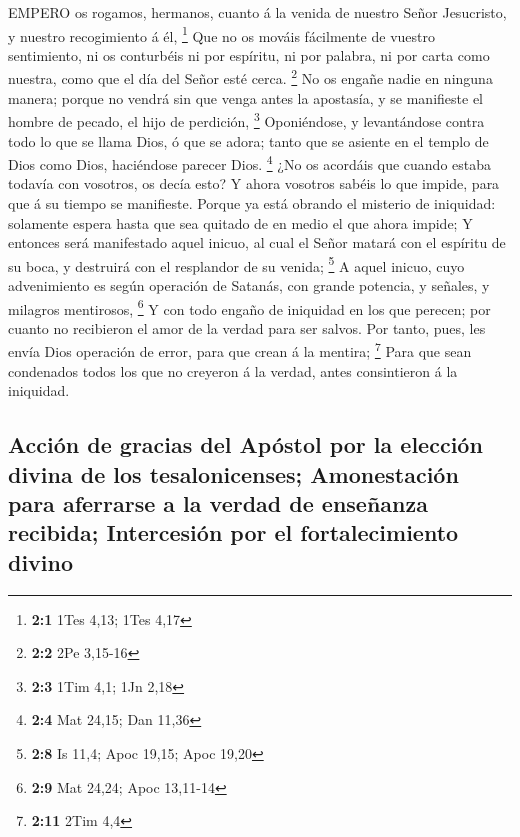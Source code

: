  EMPERO os rogamos, hermanos, cuanto á la venida de nuestro
Señor Jesucristo, y nuestro recogimiento á él, \footnote{\textbf{2:1}
  1Tes 4,13; 1Tes 4,17}  Que no os mováis fácilmente de
vuestro sentimiento, ni os conturbéis ni por espíritu, ni por palabra,
ni por carta como nuestra, como que el día del Señor esté cerca.
\footnote{\textbf{2:2} 2Pe 3,15-16}  No os engañe nadie en
ninguna manera; porque no vendrá sin que venga antes la apostasía, y se
manifieste el hombre de pecado, el hijo de perdición, \footnote{\textbf{2:3}
  1Tim 4,1; 1Jn 2,18}  Oponiéndose, y levantándose contra
todo lo que se llama Dios, ó que se adora; tanto que se asiente en el
templo de Dios como Dios, haciéndose parecer Dios. \footnote{\textbf{2:4}
  Mat 24,15; Dan 11,36}  ¿No os acordáis que cuando estaba
todavía con vosotros, os decía esto?  Y ahora vosotros
sabéis lo que impide, para que á su tiempo se manifieste. 
Porque ya está obrando el misterio de iniquidad: solamente espera hasta
que sea quitado de en medio el que ahora impide;  Y entonces
será manifestado aquel inicuo, al cual el Señor matará con el espíritu
de su boca, y destruirá con el resplandor de su venida; \footnote{\textbf{2:8}
  Is 11,4; Apoc 19,15; Apoc 19,20}  A aquel inicuo, cuyo
advenimiento es según operación de Satanás, con grande potencia, y
señales, y milagros mentirosos, \footnote{\textbf{2:9} Mat 24,24; Apoc
  13,11-14}  Y con todo engaño de iniquidad en los que
perecen; por cuanto no recibieron el amor de la verdad para ser salvos.
 Por tanto, pues, les envía Dios operación de error, para
que crean á la mentira; \footnote{\textbf{2:11} 2Tim 4,4} 
Para que sean condenados todos los que no creyeron á la verdad, antes
consintieron á la iniquidad.

\hypertarget{acciuxf3n-de-gracias-del-apuxf3stol-por-la-elecciuxf3n-divina-de-los-tesalonicenses-amonestaciuxf3n-para-aferrarse-a-la-verdad-de-enseuxf1anza-recibida-intercesiuxf3n-por-el-fortalecimiento-divino}{%
\subsection{Acción de gracias del Apóstol por la elección divina de los
tesalonicenses; Amonestación para aferrarse a la verdad de enseñanza
recibida; Intercesión por el fortalecimiento
divino}\label{acciuxf3n-de-gracias-del-apuxf3stol-por-la-elecciuxf3n-divina-de-los-tesalonicenses-amonestaciuxf3n-para-aferrarse-a-la-verdad-de-enseuxf1anza-recibida-intercesiuxf3n-por-el-fortalecimiento-divino}}

